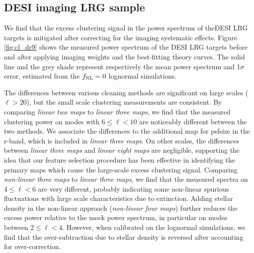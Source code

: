 \subsection{DESI imaging LRG sample}
We find that the excess clustering signal in the power spectrum of the\mr DESI LRG targets is mitigated after correcting for the imaging systematic effects. Figure \ref{fig:cl_dr9} shows the measured power spectrum of the DESI LRG targets before and after applying imaging weights and the best-fitting theory curves. The solid line and the grey shade represent respectively the mean power spectrum and 1$\sigma$ error, estimated from the $f_{\rm NL}=0$ lognormal simulations. 



The differences between various cleaning methods are significant on large scales ($\ell > 20$), but the small scale clustering measurements are consistent. By comparing \textit{linear two maps} to \textit{linear three maps}, we find that the measured clustering power on modes with $6\leq \ell < 10$ are noticeably different between the two methods. We associate the differences to the additional map for psfsize in the r-band, which is included in \textit{linear three maps}. On other scales, the differences between \textit{linear three maps} and \textit{linear eight maps} are negligible, supporting the idea that our feature selection procedure has been effective in identifying the primary maps which cause the large-scale excess clustering signal. Comparing \textit{non-linear three maps} to \textit{linear three maps}, we find that the measured spectra on $4 \leq \ell < 6$ are very different, probably indicating some non-linear spurious fluctuations with large scale characteristics due to extinction. Adding stellar density in the non-linear approach (\textit{non-linear four maps}) further reduces the excess power relative to the mock power spectrum, in particular on modes between $2\leq \ell < 4$. However, when calibrated on the lognormal simulations, we find that the over-subtraction due to stellar density is reversed after accounting for over-correction.


